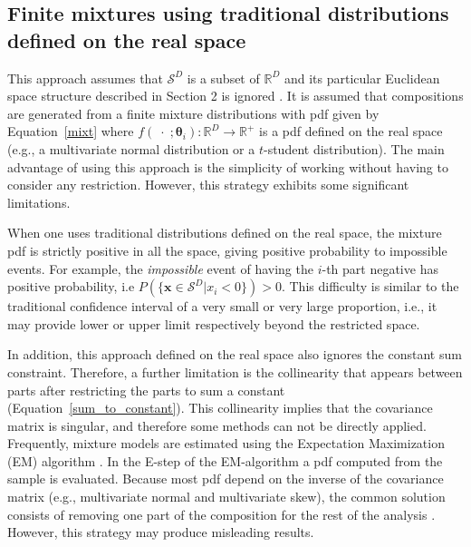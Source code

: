 \documentclass[12pt, a4paper]{article}
\newcommand{\m}[1]{\boldsymbol{#1}}
\begin{document}
\subsection{Finite mixtures using traditional distributions defined on the real space}
\label{real_section}

This approach assumes that $\mathcal{S}^D$ is a subset of $\mathbb{R}^D$ and its particular Euclidean space structure described in Section 2 is ignored \citep[][]{papageorgiou2001model}. It is assumed that compositions  are generated from a finite mixture distributions with pdf given by Equation~\ref{mixt} where $f(\;\cdot\;;\m\theta_i): \mathbb{R}^D \rightarrow \mathbb{R}^+$ is a pdf defined on the real space (e.g., a multivariate normal distribution or a  $t$-student distribution). The main advantage of using this approach is the simplicity of working without having to consider any restriction. However, this strategy exhibits some significant limitations.

When one uses traditional distributions defined on the real space, the mixture pdf is strictly positive in all the space, giving positive probability to impossible events. For example, the \emph{impossible} event  of having the $i$-th part negative has positive probability, i.e $P(\{ \textbf{x} \in \mathcal{S}^D | x_i < 0 \}) > 0$. This difficulty is similar to the traditional confidence interval of a very small or very large proportion, i.e., it may provide lower or upper limit respectively beyond the restricted space. 

In addition, this approach defined on the real space also ignores the constant sum constraint. Therefore, a further limitation is the collinearity that appears between parts  after restricting the parts to sum a constant (Equation~\ref{sum_to_constant}). This collinearity implies that the covariance matrix is singular, and therefore some methods can not be directly applied. Frequently, mixture models are estimated using the Expectation Maximization (EM) algorithm \citep{dempster1977maximum}. In the E-step of the EM-algorithm a pdf computed from the sample is evaluated. Because most pdf depend on the inverse of the covariance matrix (e.g., multivariate normal and multivariate skew), the common solution consists of removing one part of the composition for the rest of the analysis \citep{papageorgiou2001model}. However, this strategy may  produce misleading results.   
\end{document}

